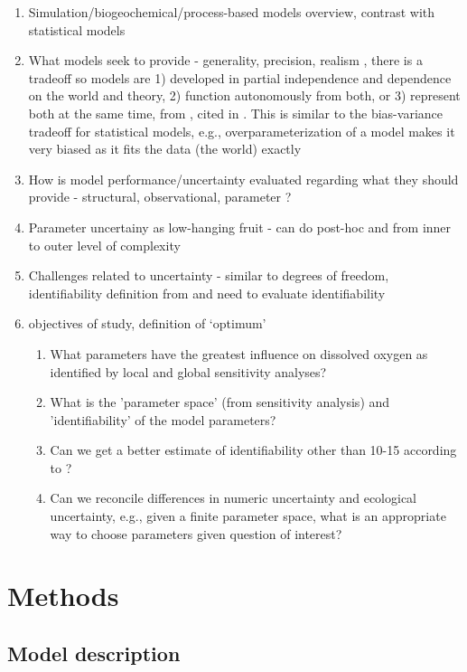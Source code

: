 \documentclass[letterpaper,12pt,oneside]{article}\usepackage[]{graphicx}\usepackage[]{color}
\begin{document}
\begin{enumerate}
\item Simulation/biogeochemical/process-based models overview, contrast with statistical models
\item What models seek to provide - generality, precision, realism \cite{Levins66}, there is a tradeoff so models are 1) developed in partial independence and dependence on the world and theory, 2) function autonomously from both, or 3) represent both at the same time, from \cite{Morrison99}, cited in \cite{Ganju16}.  This is similar to the bias-variance tradeoff for statistical models, e.g., overparameterization of a model makes it very biased as it fits the data (the world) exactly
\item How is model performance/uncertainty evaluated regarding what they should provide - structural, observational, parameter \cite{Beck87}?
\item Parameter uncertainy as low-hanging fruit - can do post-hoc and from inner to outer level of complexity
\item Challenges related to uncertainty - similar to degrees of freedom, identifiability definition from \cite{Brun01} and need to evaluate identifiability \cite{Fasham06}
\item objectives of study, definition of `optimum'
\begin{enumerate}
\item What parameters have the greatest influence on dissolved oxygen as identified by local and global sensitivity analyses?
\item What is the 'parameter space' (from sensitivity analysis) and 'identifiability' of the model parameters?
\item Can we get a better estimate of identifiability other than 10-15 according to \cite{Brun01,Soetaert10}?
\item Can we reconcile differences in numeric uncertainty and ecological uncertainty, e.g., given a finite parameter space, what is an appropriate way to choose parameters given question of interest?  
\end{enumerate}
\end{enumerate}

\section{Methods}

\subsection{Model description}
\end{document}

